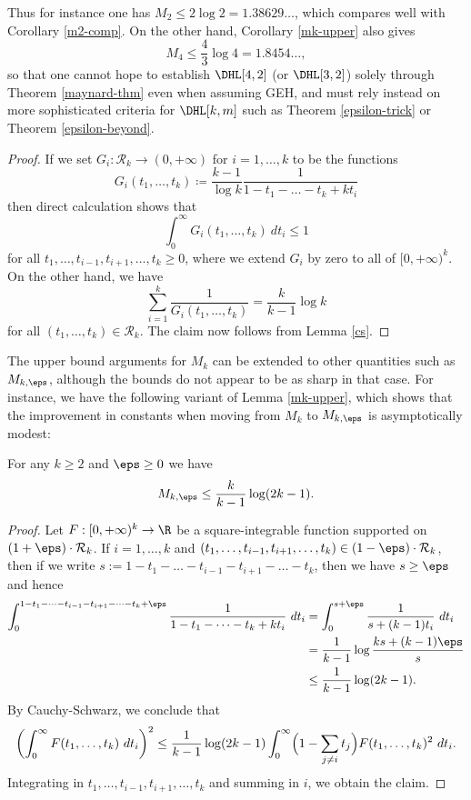 Thus for instance one has $M_2 \leq 2 \log 2 = 1.38629\dots$, which compares well with Corollary \ref{m2-comp}.  On the other hand, Corollary \ref{mk-upper} also gives
$$ M_4 \leq \frac{4}{3} \log 4 = 1.8454\dots, $$
so that one cannot hope to establish $\DHL[4,2]$ (or $\DHL[3,2]$) solely through Theorem \ref{maynard-thm} even when assuming GEH, and must rely instead on more sophisticated criteria for $\DHL[k,m]$ such as Theorem \ref{epsilon-trick} or Theorem \ref{epsilon-beyond}. 

\begin{proof}  If we set $G_i: {\mathcal R}_k \to (0,+\infty)$ for $i=1,\dots,k$ to be the functions
$$ G_i(t_1,\dots,t_k) \coloneqq \frac{k-1}{\log k} \frac{1}{1-t_1-\dots-t_k + kt_i} $$
then direct calculation shows that
$$ \int_0^\infty G_i(t_1,\dots,t_k)\ dt_i \leq 1$$
for all $t_1,\dots,t_{i-1},t_{i+1},\dots,t_k \geq 0$, where we extend $G_i$ by zero to all of $[0,+\infty)^k$.  On the other hand, we have
$$ \sum_{i=1}^k \frac{1}{G_i(t_1,\dots,t_k)} = \frac{k}{k-1} \log k$$
for all $(t_1,\dots,t_k) \in {\mathcal R}_k$.  The claim now follows from Lemma \ref{cs}.
\end{proof}

The upper bound arguments for $M_k$ can be extended to other quantities such as $M_{k,\eps}$, although the bounds do not appear to be as sharp in that case.  For instance, we have the following variant of Lemma \ref{mk-upper}, which shows that the improvement in constants when moving from $M_k$ to $M_{k,\eps}$ is asymptotically modest:

\begin{proposition}\label{mkeps}  For any $k \geq 2$ and $\eps \geq 0$ we have
$$ M_{k,\eps} \leq \frac{k}{k-1} \log(2k-1).$$
\end{proposition}

\begin{proof}  
Let $F: [0,+\infty)^k \to \R$ be a square-integrable function supported on $(1+\eps) \cdot {\mathcal R}_k$.  If $i=1,\dots,k$ and $(t_1,\dots,t_{i-1},t_{i+1},\dots,t_k) \in (1-\eps) \cdot {\mathcal R}_k$, then if we write $s := 1-t_1-\dots-t_{i-1}-t_{i+1}-\dots-t_k$, then we have $s \geq \eps$ and hence
\begin{align*}
\int_0^{1-t_1-\dots-t_{i-1}-t_{i+1}-\dots-t_k+\eps} \frac{1}{1-t_1-\dots-t_k + kt_i}\ dt_i 
&= \int_0^{s+\eps} \frac{1}{s+(k-1)t_i}\ dt_i \\
&= \frac{1}{k-1} \log \frac{ks + (k-1)\eps}{s} \\
&\leq \frac{1}{k-1} \log(2k-1).
\end{align*}
By Cauchy-Schwarz, we conclude that
$$ \left(\int_0^\infty F(t_1,\dots,t_k)\ dt_i\right)^2 \leq \frac{1}{k-1} \log(2k-1) \int_0^\infty \Bigl(1-\sum_{j\ne i}t_j\Bigr) F(t_1,\dots,t_k)^2\ dt_i.$$
Integrating in $t_1,\dots,t_{i-1},t_{i+1},\dots,t_k$ and summing in $i$, we obtain the claim.
\end{proof}

